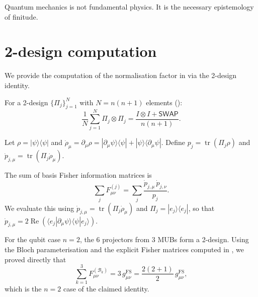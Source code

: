 \documentclass[12pt,a4paper]{article}
\theoremstyle{definition}
\newcommand{\tr}{\operatorname{tr}}
\newcommand{\Bcal}{\mathcal{B}}
\newcommand{\ip}[2]{\langle #1 | #2 \rangle}
\newcommand{\ketbra}[2]{| #1 \rangle\langle #2 |}
\begin{document}
Quantum mechanics is not fundamental physics. It is the necessary
epistemology of finitude.

\appendix

\section{2-design computation}
\label{app:2design-proof}

We provide the computation of the normalisation factor in
 via the 2-design identity.

For a 2-design $\{\Pi_j\}_{j=1}^N$ with $N = n(n+1)$ elements
():
\begin{equation}
  \label{eq:2design}
  \frac{1}{N}\sum_{j=1}^N \Pi_j \otimes \Pi_j
  = \frac{I \otimes I + \mathsf{SWAP}}{n(n+1)}.
\end{equation}

Let $\rho = \ketbra{\psi}{\psi}$ and
$\dot{\rho}_\mu = \partial_\mu \rho
= \ketbra{\partial_\mu\psi}{\psi} + \ketbra{\psi}{\partial_\mu\psi}$.
Define $p_j = \tr(\Pi_j \rho)$ and
$\dot{p}_{j,\mu} = \tr(\Pi_j \dot{\rho}_\mu)$.

The sum of basis Fisher information matrices is
\begin{equation}
  \sum_j F^{(j)}_{\mu\nu}
  = \sum_j \frac{\dot{p}_{j,\mu}\, \dot{p}_{j,\nu}}{p_j}.
\end{equation}
We evaluate this using $\dot{p}_{j,\mu} = \tr(\Pi_j \dot\rho_\mu)$
and $\Pi_j = \ketbra{e_j}{e_j}$, so that
$\dot{p}_{j,\mu} = 2\operatorname{Re}(\ip{e_j}{\partial_\mu\psi}
\ip{\psi}{e_j})$.

For the qubit case $n = 2$, the 6 projectors from 3 MUBs form a
2-design. Using the Bloch parameterisation and the explicit Fisher
matrices computed in , we proved directly that
\begin{equation}
  \sum_{k=1}^{3} F^{(\Bcal_k)}_{\mu\nu}
  = 3\, g^{\mathrm{FS}}_{\mu\nu}
  = \frac{2(2+1)}{2}\, g^{\mathrm{FS}}_{\mu\nu},
\end{equation}
which is the $n = 2$ case of the claimed identity.
\end{document}
